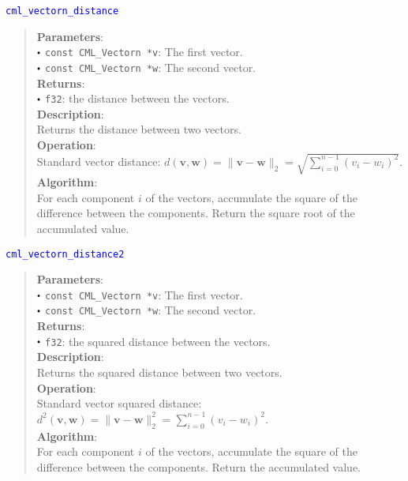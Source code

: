 \documentclass[a4paper,oneside,8pt]{extarticle}
\newcommand{\function}[1]{
  \noindent\textcolor{blue}{\texttt{#1}}
  \vspace{-0.3em}
}
\renewcommand{\dot}{\raisebox{0.3ex}{\scalebox{0.6}{$\bullet$}}}
\theoremstyle{definition}
\begin{document}
\function{cml\_vectorn\_distance}
\begin{quote}
  \textbf{Parameters}: \\
  $\dot$ \texttt{const CML\_Vectorn *v}: The first vector. \\
  $\dot$ \texttt{const CML\_Vectorn *w}: The second vector. \\
  \textbf{Returns}: \\
  $\dot$ \texttt{f32}: the distance between the vectors. \\

  \vspace{-0.75em}
  \textbf{Description}: \\
  Returns the distance between two vectors. \\

  \vspace{-0.75em}
  \textbf{Operation}: \\
  Standard vector distance: $d(\mathbf{v}, \mathbf{w}) = \lVert\mathbf{v} - \mathbf{w}\rVert_2 = \sqrt{\sum_{i=0}^{n-1} (v_i - w_i)^2}$. \\

  \vspace{-0.75em}
  \textbf{Algorithm}: \\
  For each component $i$ of the vectors, accumulate the square of the difference between the components. Return the square root of the accumulated value. \\
\end{quote}

\function{cml\_vectorn\_distance2}
\begin{quote}
  \textbf{Parameters}: \\
  $\dot$ \texttt{const CML\_Vectorn *v}: The first vector. \\
  $\dot$ \texttt{const CML\_Vectorn *w}: The second vector. \\
  \textbf{Returns}: \\
  $\dot$ \texttt{f32}: the squared distance between the vectors. \\

  \vspace{-0.75em}
  \textbf{Description}: \\
  Returns the squared distance between two vectors. \\

  \vspace{-0.75em}
  \textbf{Operation}: \\
  Standard vector squared distance: $d^2(\mathbf{v}, \mathbf{w}) = \lVert\mathbf{v} - \mathbf{w}\rVert_2^2 = \sum_{i=0}^{n-1} (v_i - w_i)^2$. \\

  \vspace{-0.75em}
  \textbf{Algorithm}: \\
  For each component $i$ of the vectors, accumulate the square of the difference between the components. Return the accumulated value. \\
\end{quote}
\end{document}
